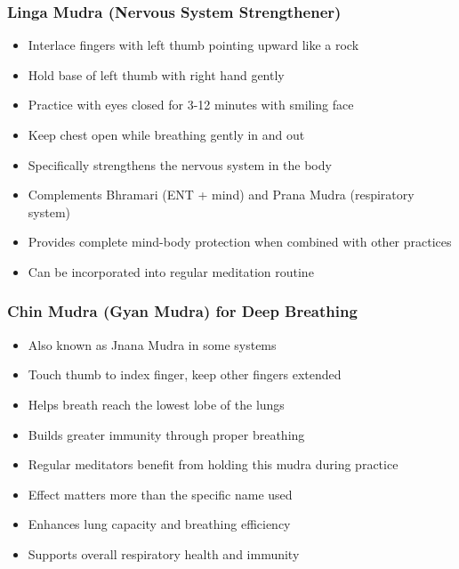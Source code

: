 \begin{frame}[fragile]\frametitle{Linga Mudra (Nervous System Strengthener)}
      \begin{itemize}
	\item Interlace fingers with left thumb pointing upward like a rock
	\item Hold base of left thumb with right hand gently
	\item Practice with eyes closed for 3-12 minutes with smiling face
	\item Keep chest open while breathing gently in and out
	\item Specifically strengthens the nervous system in the body
	\item Complements Bhramari (ENT + mind) and Prana Mudra (respiratory system)
	\item Provides complete mind-body protection when combined with other practices
	\item Can be incorporated into regular meditation routine
	  \end{itemize}
\end{frame}

\begin{frame}[fragile]\frametitle{Chin Mudra (Gyan Mudra) for Deep Breathing}
      \begin{itemize}
	\item Also known as Jnana Mudra in some systems
	\item Touch thumb to index finger, keep other fingers extended
	\item Helps breath reach the lowest lobe of the lungs
	\item Builds greater immunity through proper breathing
	\item Regular meditators benefit from holding this mudra during practice
	\item Effect matters more than the specific name used
	\item Enhances lung capacity and breathing efficiency
	\item Supports overall respiratory health and immunity
	  \end{itemize}
\end{frame}

